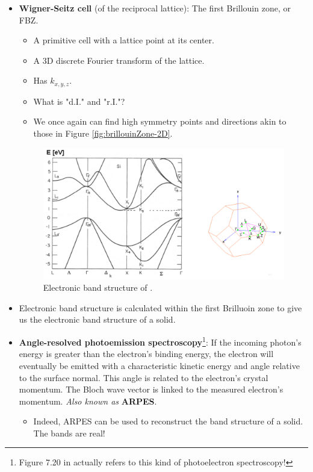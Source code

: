 \documentclass[../notes.tex]{subfiles}
\begin{document}
\begin{itemize}
    \item \textbf{Wigner-Seitz cell} (of the reciprocal lattice): The first Brillouin zone, or FBZ.
    \begin{itemize}
        \item A primitive cell with a lattice point at its center.
        \item A 3D discrete Fourier transform of the lattice.
        \item Has $k_{x,y,z}$.
        \item What is "d.I." and "r.I."?
        \item We once again can find high symmetry points and directions akin to those in Figure \ref{fig:brillouinZone-2D}.
    \end{itemize}
    \begin{figure}[h!]
        \centering
        \includegraphics[width=0.75\linewidth]{../ExtFiles/bandStructure-Si.png}
        \caption{Electronic band structure of .}
        \label{fig:bandStructure-Si}
    \end{figure}
    \item Electronic band structure is calculated within the first Brilluoin zone to give us the electronic band structure of a solid.
    \item \textbf{Angle-resolved photoemission spectroscopy}\footnote{Figure 7.20 in \textcite{bib:APChemNotes} actually refers to this kind of photoelectron spectroscopy!}: If the incoming photon's energy is greater than the electron's binding energy, the electron will eventually be emitted with a characteristic kinetic energy and angle relative to the surface normal. This angle is related to the electron's crystal momentum. The Bloch wave vector is linked to the measured electron's momentum. \emph{Also known as} \textbf{ARPES}.
    \begin{itemize}
        \item Indeed, ARPES can be used to reconstruct the band structure of a solid. The bands are real!
    \end{itemize}
\end{itemize}
\end{document}
